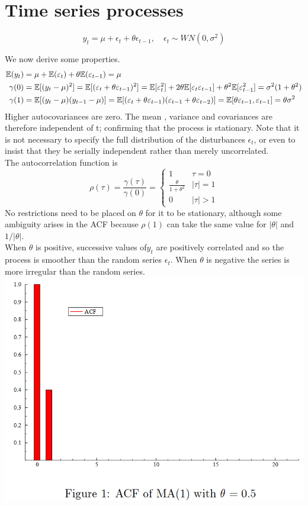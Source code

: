 \documentclass[DIV=14,titlepage=false]{scrreprt}
\begin{document}
\section{Time series processes}
\begin{definition}[MA(1) Process]
    \[ y_t = \mu + \epsilon_t + \theta \epsilon_{t-1}, \quad \epsilon_t \sim WN(0, \sigma^2) \]
\end{definition}
We now derive some properties.
\begin{align*}
    \mathbb{E}(y_t) &= \mu + \mathbb{E}(\varepsilon_t) + \theta \mathbb{E}(\varepsilon_{t-1}) = \mu\\
    \gamma(0) &= \mathbb{E}[(y_t - \mu)^2] = \mathbb{E}[(\varepsilon_t + \theta \varepsilon_{t-1})^2] = \mathbb{E}[\varepsilon_t^2] + 2 \theta \mathbb{E}[\varepsilon_t \varepsilon_{t-1}] + \theta^2 \mathbb{E}[\varepsilon_{t-1}^2] = \sigma^2 (1 + \theta^2)\\
    \gamma(1) &= \mathbb{E}[(y_t - \mu)(y_{t-1} - \mu)] = \mathbb{E}[(\varepsilon_t + \theta \varepsilon_{t-1})(\varepsilon_{t-1} + \theta \varepsilon_{t-2})] = \mathbb{E} [ \theta \varepsilon_{t-1}, \varepsilon_{t-1} ] = \theta \sigma^2
\end{align*}
Higher autocovariances are zero. The mean , variance and covariances are therefore independent of t; confirming that the process is stationary. Note that it is not necessary to specify the full distribution of the disturbances $\epsilon_t$, or even to insist that they be serially independent rather than merely uncorrelated. \\
The autocorrelation function is 
\[
    \rho(\tau) = \frac{\gamma(\tau)}{\gamma(0)} = \begin{cases}
        1 & \tau = 0\\
        \frac{\theta}{1 + \theta^2} & |\tau| = 1\\
        0 & |\tau| > 1
    \end{cases}
\]
No restrictions need to be placed on $\theta$ for it to be stationary, although some ambiguity arises in the ACF because $\rho(1)$ can take the same value for $|\theta|$ and $1/|\theta|$.\\
When $\theta$ is positive, successive values of$y_t$ are positively correlated and so the process is smoother than the random series $\epsilon_t$. When $\theta$ is negative the series is more irregular than the random series.
\includegraphics[width=\textwidth]{./Images/MA(1)-ACF.png}
\end{document}

